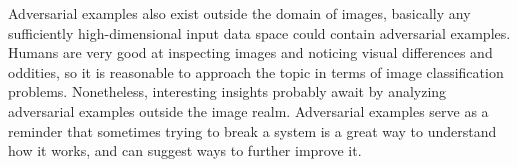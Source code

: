 \documentclass[11pt, a4paper]{article}
\begin{document}
Adversarial examples also exist outside the domain of images, basically any sufficiently high-dimensional input data space could contain adversarial examples. Humans are very good at inspecting images and noticing visual differences and oddities, so it is reasonable to approach the topic in terms of image classification problems. Nonetheless, interesting insights probably await by analyzing adversarial examples outside the image realm. Adversarial examples serve as a reminder that sometimes trying to break a system is a great way to understand how it works, and can suggest ways to further improve it.

\end{document}
